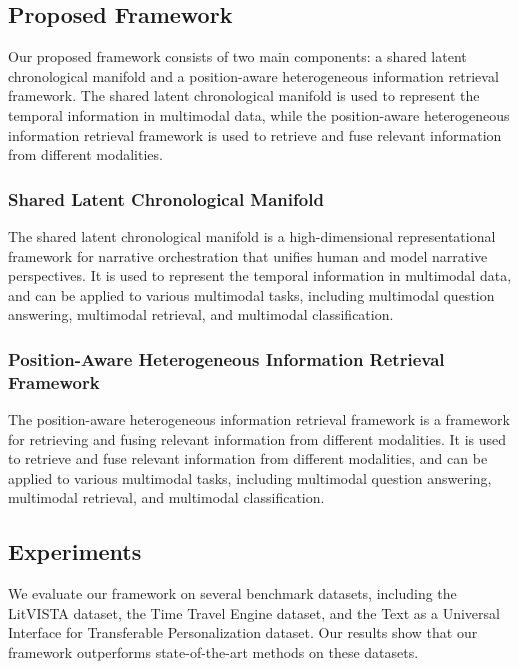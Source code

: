 \documentclass{article}
\begin{document}
\subsection{Proposed Framework}

Our proposed framework consists of two main components: a shared latent chronological manifold and a position-aware heterogeneous information retrieval framework. The shared latent chronological manifold is used to represent the temporal information in multimodal data, while the position-aware heterogeneous information retrieval framework is used to retrieve and fuse relevant information from different modalities.

\subsubsection{Shared Latent Chronological Manifold}

The shared latent chronological manifold is a high-dimensional representational framework for narrative orchestration that unifies human and model narrative perspectives. It is used to represent the temporal information in multimodal data, and can be applied to various multimodal tasks, including multimodal question answering, multimodal retrieval, and multimodal classification.

\subsubsection{Position-Aware Heterogeneous Information Retrieval Framework}

The position-aware heterogeneous information retrieval framework is a framework for retrieving and fusing relevant information from different modalities. It is used to retrieve and fuse relevant information from different modalities, and can be applied to various multimodal tasks, including multimodal question answering, multimodal retrieval, and multimodal classification.

\subsection{Experiments}

We evaluate our framework on several benchmark datasets, including the LitVISTA dataset, the Time Travel Engine dataset, and the Text as a Universal Interface for Transferable Personalization dataset. Our results show that our framework outperforms state-of-the-art methods on these datasets.
\end{document}
